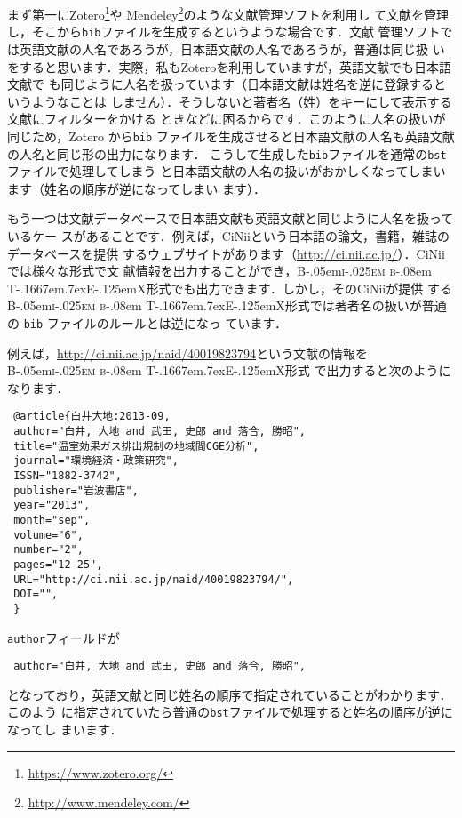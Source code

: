\documentclass[article]{jlreq}
\newcommand{\BibTeX}{\textrm{B\kern-.05em\textsc{i\kern-.025em b}\kern-.08em%
T\kern-.1667em\lower.7ex\hbox{E}\kern-.125emX}}
\begin{document}
まず第一にZotero\footnote{\url{https://www.zotero.org/}}や
Mendeley\footnote{\url{http://www.mendeley.com/}}のような文献管理ソフトを利用し
て文献を管理し，そこから\texttt{bib}ファイルを生成するというような場合です．文献
管理ソフトでは英語文献の人名であろうが，日本語文献の人名であろうが，普通は同じ扱
いをすると思います．実際，私もZoteroを利用していますが，英語文献でも日本語文献で
も同じように人名を扱っています（日本語文献は姓名を逆に登録するというようなことは
しません）．そうしないと著者名（姓）をキーにして表示する文献にフィルターをかける
ときなどに困るからです．このように人名の扱いが同じため，Zotero から\texttt{bib}
ファイルを生成させると日本語文献の人名も英語文献の人名と同じ形の出力になります．
こうして生成した\texttt{bib}ファイルを通常の\texttt{bst}ファイルで処理してしまう
と日本語文献の人名の扱いがおかしくなってしまいます（姓名の順序が逆になってしまい
ます）．\vspace*{1em}

もう一つは文献データベースで日本語文献も英語文献と同じように人名を扱っているケー
スがあることです．例えば，CiNiiという日本語の論文，書籍，雑誌のデータベースを提供
するウェブサイトがあります（\url{http://ci.nii.ac.jp/}）．CiNiiでは様々な形式で文
献情報を出力することができ，\BibTeX 形式でも出力できます．しかし，そのCiNiiが提供
する \BibTeX 形式では著者名の扱いが普通の \texttt{bib} ファイルのルールとは逆になっ
ています．

例えば，\url{http://ci.nii.ac.jp/naid/40019823794}という文献の情報を \BibTeX 形式
で出力すると次のようになります．
\begin{screen}
\begin{verbatim}
 @article{白井大地:2013-09,
 author="白井, 大地 and 武田, 史郎 and 落合, 勝昭",
 title="温室効果ガス排出規制の地域間CGE分析",
 journal="環境経済・政策研究",
 ISSN="1882-3742",
 publisher="岩波書店",
 year="2013",
 month="sep",
 volume="6",
 number="2",
 pages="12-25",
 URL="http://ci.nii.ac.jp/naid/40019823794/",
 DOI="",
 }
\end{verbatim}
\end{screen}
\texttt{author}フィールドが
\begin{screen}
\begin{verbatim}
 author="白井, 大地 and 武田, 史郎 and 落合, 勝昭",
\end{verbatim}
\end{screen}
となっており，英語文献と同じ姓名の順序で指定されていることがわかります．このよう
に指定されていたら普通の\texttt{bst}ファイルで処理すると姓名の順序が逆になってし
まいます．
\end{document}
